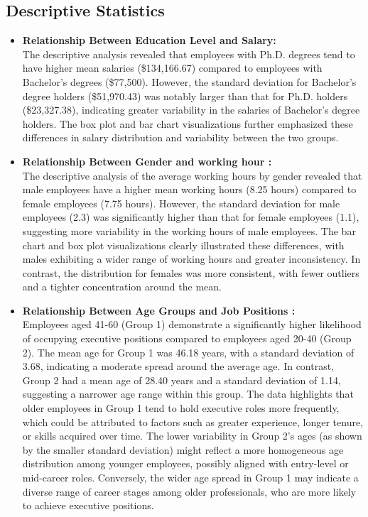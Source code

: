 \documentclass[12pt,a4paper]{article}
\begin{document}
\subsection{Descriptive Statistics}
\begin{itemize}
    \item \textbf{Relationship Between Education Level and Salary:} \\
    The descriptive analysis revealed that employees with Ph.D. degrees tend to have higher mean salaries (\$134,166.67) compared to employees with Bachelor's degrees (\$77,500). However, the standard deviation for Bachelor's degree holders (\$51,970.43) was notably larger than that for Ph.D. holders (\$23,327.38), indicating greater variability in the salaries of Bachelor's degree holders. The box plot and bar chart visualizations further emphasized these differences in salary distribution and variability between the two groups.

      \item \textbf{ Relationship Between Gender and working hour :} \\
The descriptive analysis of the average working hours by gender revealed that male employees have a higher mean working hours (8.25 hours) compared to female employees (7.75 hours). However, the standard deviation for male employees (2.3) was significantly higher than that for female employees (1.1), suggesting more variability in the working hours of male employees. The bar chart and box plot visualizations clearly illustrated these differences, with males exhibiting a wider range of working hours and greater inconsistency. In contrast, the distribution for females was more consistent, with fewer outliers and a tighter concentration around the mean.

\vspace{1em}
    \item \textbf{ Relationship Between Age Groups and Job Positions :} \\
    Employees aged 41-60 (Group 1) demonstrate a significantly higher likelihood of occupying executive positions compared to employees aged 20-40 (Group 2). The mean age for Group 1 was 46.18 years, with a standard deviation of 3.68, indicating a moderate spread around the average age. In contrast, Group 2 had a mean age of 28.40 years and a standard deviation of 1.14, suggesting a narrower age range within this group. The data highlights that older employees in Group 1 tend to hold executive roles more frequently, which could be attributed to factors such as greater experience, longer tenure, or skills acquired over time. The lower variability in Group 2's ages (as shown by the smaller standard deviation) might reflect a more homogeneous age distribution among younger employees, possibly aligned with entry-level or mid-career roles. Conversely, the wider age spread in Group 1 may indicate a diverse range of career stages among older professionals, who are more likely to achieve executive positions.



\end{itemize}
\end{document}

